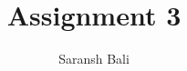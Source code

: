 \documentclass[journal,12pt,twocolumn]{IEEEtran}
\begin{document}
\makeatletter
{}
\makeatother
\let\StandardTheFigure\thefigure
\let\vec\mathbf
\renewcommand{\thefigure}{\theproblem}
\def\putbox#1#2#3{\makebox[0in][l]{\makebox[#1][l]{}\raisebox{\baselineskip}[0in][0in]{\raisebox{#2}[0in][0in]{#3}}}}
     \def\rightbox#1{\makebox[0in][r]{#1}}
     \def\centbox#1{\makebox[0in]{#1}}
     \def\topbox#1{\raisebox{-\baselineskip}[0in][0in]{#1}}
     \def\midbox#1{\raisebox{-0.5\baselineskip}[0in][0in]{#1}}
\vspace{3cm}
\title{Assignment 3}
\author{Saransh Bali}
%
%
%
% 
%
\end{document}
